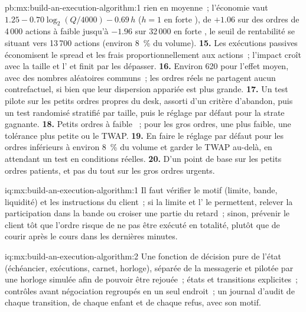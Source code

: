 \begin{solution}{pb:mx:build-an-execution-algorithm:1}
rien en moyenne~; l'économie vaut $1.25-0.70\log_2(Q/4000)-0.69\,h$ ($h=1$ en forte ), de $+1.06$ sur des ordres de 4\,000 actions à faible 
jusqu'à $-1.96$ sur 32\,000 en forte , le seuil de rentabilité se situant vers 13\,700 actions (environ 8~\% du volume).
\textbf{15.} Les exécutions passives économisent le spread et les frais proportionnellement aux actions~; l'impact croît avec la taille et l' et finit par les dépasser.
\textbf{16.} Environ 620 pour l'effet moyen, avec des nombres aléatoires communs~; les ordres réels ne partagent aucun contrefactuel, si bien que leur dispersion appariée est plus grande.
\textbf{17.} Un test pilote sur les petits ordres propres du desk, assorti d'un critère d'abandon, puis un test randomisé stratifié par taille, puis le réglage par défaut pour la strate gagnante.
\textbf{18.} Petits ordres à faible ~; pour les gros ordres, une  plus faible, une tolérance plus petite ou le TWAP.
\textbf{19.} En faire le réglage par défaut pour les ordres inférieurs à environ 8~\% du volume et garder le TWAP au-delà, en attendant un test en conditions réelles.
\textbf{20.} D'un point de base sur les petits ordres patients, et pas du tout sur les gros ordres urgents.
\end{solution}

\begin{solution}{iq:mx:build-an-execution-algorithm:1}
Il faut vérifier le motif (limite, bande, liquidité) et les instructions du client~; si la limite et l' le permettent, relever la participation dans la bande ou croiser
une partie du retard~; sinon, prévenir le client tôt que l'ordre risque de ne pas être exécuté en totalité, plutôt que de courir après le cours dans les dernières minutes.
\end{solution}

\begin{solution}{iq:mx:build-an-execution-algorithm:2}
Une fonction de décision pure de l'état (échéancier, exécutions, carnet, horloge), séparée de la messagerie et pilotée par une horloge simulée afin de pouvoir être
rejouée~; états et transitions explicites~; contrôles avant négociation regroupés en un seul endroit~; un journal d'audit de chaque transition, de chaque enfant et de chaque refus, avec son motif.
\end{solution}

